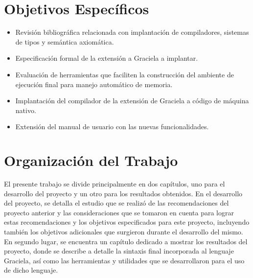 \section*{Objetivos Específicos}
\begin{itemize}
  \item Revisión bibliográfica relacionada con implantación de compiladores,
  sistemas de tipos y semántica axiomática.

  \item Especificación formal de la extensión a Graciela a implantar.

  \item Evaluación de herramientas que faciliten la construcción del ambiente de
  ejecución final para manejo automático de memoria.

  \item Implantación del compilador de la extensión de Graciela a código de
  máquina nativo.

  \item Extensión del manual de usuario con las nuevas funcionalidades.
\end{itemize}

\section*{Organización del Trabajo}

El presente trabajo se divide principalmente en dos capítulos, uno para el
desarrollo del proyecto y un otro para los resultados obtenidos. En el
desarrollo del proyecto, se detalla el estudio que se realizó de las
recomendaciones del proyecto anterior y las consideraciones que se tomaron en
cuenta para lograr estas recomendaciones y los objetivos especificados para
este proyecto, incluyendo también los objetivos adicionales que surgieron
durante el desarrollo del mismo. En segundo lugar, se encuentra un capítulo
dedicado a mostrar los resultados del proyecto, donde se describe a detalle la
sintaxis final incorporada al lenguaje Graciela, así como las herramientas
y utilidades que se desarrollaron para el uso de dicho lenguaje.


